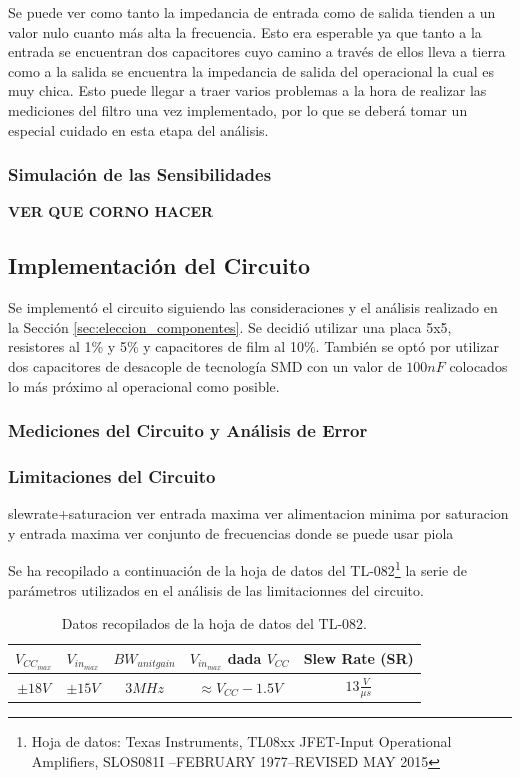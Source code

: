 \documentclass[a4paper]{article}
\begin{document}
Se puede ver como tanto la impedancia de entrada como de salida tienden a un valor nulo cuanto más alta la frecuencia. Esto era esperable ya que tanto a la entrada se encuentran dos capacitores cuyo camino a través de ellos lleva a tierra como a la salida se encuentra la impedancia de salida del operacional la cual es muy chica. Esto puede llegar a traer varios problemas a la hora de realizar las mediciones del filtro una vez implementado, por lo que se deberá tomar un especial cuidado en esta etapa del análisis. 

\subsubsection{Simulación de las Sensibilidades}
\textbf{VER QUE CORNO HACER}

\subsection{Implementación del Circuito}
Se implementó el circuito siguiendo las consideraciones y el análisis realizado en la Sección \ref{sec:eleccion_componentes}. Se decidió utilizar una placa 5x5, resistores al 1\% y 5\% y capacitores de film al 10\%. También se optó por utilizar dos capacitores de desacople de tecnología SMD con un valor de $100nF$ colocados lo más próximo al operacional como posible. 
\subsubsection{Mediciones del Circuito y Análisis de Error}
\subsubsection{Limitaciones del Circuito}
\label{sec:limitaciones}

slewrate+saturacion ver entrada maxima
ver alimentacion minima por saturacion y entrada maxima
ver conjunto de frecuencias donde se puede usar piola

Se ha recopilado a continuación de la hoja de datos del TL-082\footnote{Hoja de datos: Texas Instruments, TL08xx JFET-Input Operational Amplifiers, SLOS081I –FEBRUARY 1977–REVISED MAY 2015} la serie de parámetros utilizados en el análisis de las limitacionnes del circuito.

\begin{table}[H]
\centering
\begin{tabular}{@{}ccccc@{}}
\toprule
$V_{CC_{max}}$ & $V_{in_{max}}$ & $BW_{unitgain}$ & $V_{in_{max}}$ dada $V_{CC}$ & Slew Rate (SR)\\ \midrule
$\pm 18V$ & $\pm 15V$ & $3MHz$ & $\approx V_{CC}-1.5V$ & $13\frac{V}{\mu s}$\\ \bottomrule
\end{tabular}
\caption{Datos recopilados de la hoja de datos del TL-082.}
\label{tab:datos_tl082}
\end{table}
\end{document}
